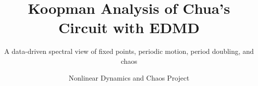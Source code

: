 \documentclass[aspectratio=169,10pt]{beamer}
\title[Koopman Analysis of Chua's Circuit]{Koopman Analysis of Chua's Circuit with EDMD}
\subtitle{A data-driven spectral view of fixed points, periodic motion, period doubling, and chaos}
\author{Nonlinear Dynamics and Chaos Project}
\institute{}
\date{}
\begin{document}
\begin{frame}
    \titlepage
\end{frame}

\end{document}
